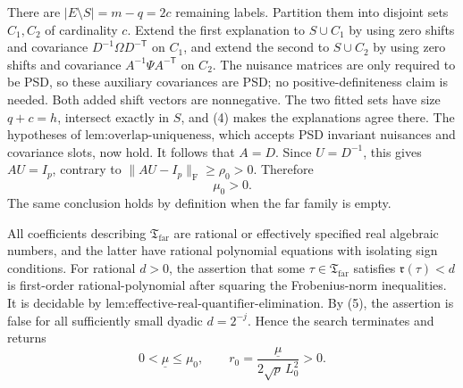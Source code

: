 There are \(|E\setminus S|=m-q=2c\) remaining labels. Partition them into disjoint sets \(C_1,C_2\) of cardinality \(c\). Extend the first explanation to \(S\cup C_1\) by using zero shifts and covariance \(D^{-1}\Omega D^{-\mathsf T}\) on \(C_1\), and extend the second to \(S\cup C_2\) by using zero shifts and covariance \(A^{-1}\Psi A^{-\mathsf T}\) on \(C_2\). The nuisance matrices are only required to be PSD, so these auxiliary covariances are PSD; no positive-definiteness claim is needed. Both added shift vectors are nonnegative. The two fitted sets have size \(q+c=h\), intersect exactly in \(S\), and (4) makes the explanations agree there. The hypotheses of \(\text{lem:overlap-uniqueness}\), which accepts PSD invariant nuisances and covariance slots, now hold. It follows that \(A=D\). Since \(U=D^{-1}\), this gives \(AU=I_p\), contrary to \(\|AU-I_p\|_{\mathrm F}\geq\rho_0>0\). Therefore
\[
\mu_0>0.
\tag{5}
\]
The same conclusion holds by definition when the far family is empty.

All coefficients describing \(\mathfrak T_{\mathrm{far}}\) are rational or effectively specified real algebraic numbers, and the latter have rational polynomial equations with isolating sign conditions. For rational \(d>0\), the assertion that some \(\tau\in\mathfrak T_{\mathrm{far}}\) satisfies \(\mathfrak r(\tau)<d\) is first-order rational-polynomial after squaring the Frobenius-norm inequalities. It is decidable by \(\text{lem:effective-real-quantifier-elimination}\). By (5), the assertion is false for all sufficiently small dyadic \(d=2^{-j}\). Hence the search terminates and returns
\[
0<\underline\mu\leq\mu_0,
\qquad
r_0=\frac{\underline\mu}{2\sqrt p\,L_0^2}>0.
\tag{6}
\]

